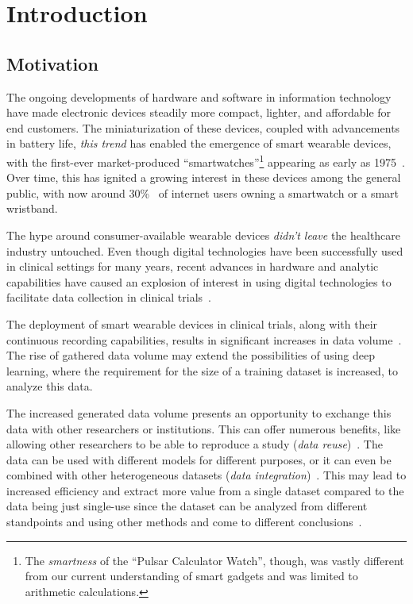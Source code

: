 \chapter{Introduction}\label{ch:introduction}

\section{Motivation}\label{sec:motivation}

The ongoing developments of hardware and software in information technology have made electronic devices steadily more compact, lighter, and affordable for end customers.
The miniaturization of these devices, coupled with advancements in battery life, \textit{this trend} has enabled the emergence of smart wearable devices, with the first-ever market-produced ``smartwatches''\footnote{The \textit{smartness} of the ``Pulsar Calculator Watch'', though, was vastly different from our current understanding of smart gadgets and was limited to arithmetic calculations.} appearing as early as 1975~\cite{ometov_survey_2021}.
Over time, this has ignited a growing interest in these devices among the general public, with now around 30\%~\cite{simon_kemp_rise_2023} of internet users owning a smartwatch or a smart wristband.

The hype around consumer-available wearable devices \textit{didn't leave} the healthcare industry untouched.
Even though digital technologies have been successfully used in clinical settings for many years, recent advances in hardware and analytic capabilities have caused an explosion of interest in using digital technologies to facilitate data collection in clinical trials~\cite{clay_impact_2017}.

The deployment of smart wearable devices in clinical trials, along with their continuous recording capabilities, results in significant increases in data volume~\cite{munos_mobile_2016}.
The rise of gathered data volume may extend the possibilities of using deep learning, where the requirement for the size of a training dataset is increased, to analyze this data.

The increased generated data volume presents an opportunity to exchange this data with other researchers or institutions.
This can offer numerous benefits, like allowing other researchers to be able to reproduce a study (\textit{data reuse})~\cite{pasquetto_reuse_2017}.
The data can be used with different models for different purposes, or it can even be combined with other heterogeneous datasets (\textit{data integration})~\cite{pasquetto_reuse_2017}.
This may lead to increased efficiency and extract more value from a single dataset compared to the data being just single-use since the dataset can be analyzed from different standpoints and using other methods and come to different conclusions~\cite{pasquetto_reuse_2017}.

